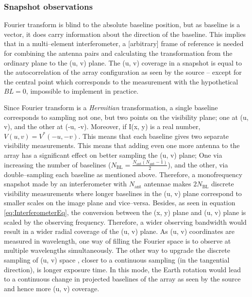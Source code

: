 \documentclass[paper=a4, fontsize=11pt]{scrartcl} %
\numberwithin{equation}{section} %
\numberwithin{figure}{section} %
\numberwithin{table}{section} %
\begin{document}
\subsubsection*{Snapshot observations}
Fourier transform is blind to the absolute baseline position, but as baseline is a vector, it does carry information about the direction of the baseline. This implies that in a multi--element interferometer, a [arbitrary] frame of reference is needed for combining the antenna pairs and calculating the transformation from the ordinary plane to the (u, v) plane. The (u, v) coverage in a snapshot is equal to the autocorrelation of the array configuration as seen by the source -- except for the central point which corresponds to the measurement with the hypothetical $BL = 0$, impossible to implement in practice.

Since Fourier transform is a \emph{Hermitian} transformation, a single baseline corresponds to sampling not one, but two points on the visibility plane; one at (u, v), and the other at (-u, -v). Moreover, if I(x, y) is a real number, $V(u, v) = V^*(-u, -v)$. This means that each baseline gives two separate visibility measurements. This means that adding even one more antenna to the array has a significant effect on better sampling the (u, v) plane; One via increasing the number of baselines ($N_\mathrm{BL} = \frac{N_\mathrm{ant}(N_\mathrm{ant}-1)}{2}$), and the other, via double--sampling each baseline as mentioned above. Therefore, a monofrequency snapshot made by an interferometer with $N_\mathrm{ant}$ antennae makes $2N_\mathrm{BL}$ discrete visibility measurements where longer baselines in the (u, v) plane correspond to smaller scales on the image plane and vice--versa. Besides, as seen in equation \ref{eq:InterferometerEq}, the conversion between the (x, y) plane and (u, v) plane is scaled by the observing frequency. Therefore, a wider observing bandwidth would result in a wider radial coverage of the (u, v) plane. As (u, v) coordinates are measured in wavelength, one way of filling the Fourier space is to observe at multiple wavelengths simultaneously. The other way to upgrade the discrete sampling of (u, v) space , closer to a continuous sampling (in the tangential direction), is longer exposure time. In this mode, the Earth rotation would lead to a continuous change in projected baselines of the array as seen by the source and hence more (u, v) coverage.
\end{document}
